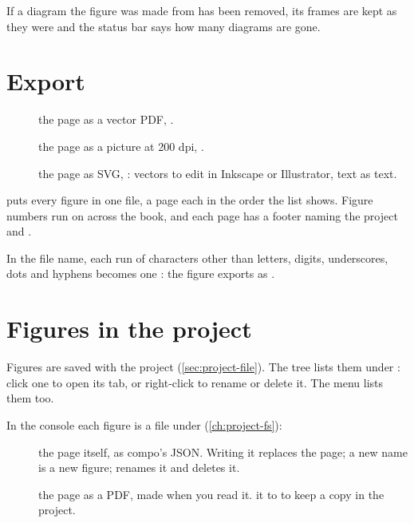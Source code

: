 If a diagram the figure was made from has been removed, its frames are kept as they were and the status
bar says how many diagrams are gone.

\section{Export}\label{sec:figure-export}

\begin{description}
\item[] the page as a vector PDF, .
\item[] the page as a picture at 200 dpi, .
\item[] the page as SVG, : vectors to edit in
Inkscape or Illustrator, text as text.
\end{description}

 puts every figure in one file, a page each in the order the
 list shows. Figure numbers run on across the book, and each page has a footer naming the project
and .

In the file name, each run of characters other than letters, digits, underscores, dots and hyphens
becomes one \code{\_}: the figure  exports as .

\section{Figures in the project}\label{sec:figures-project}

Figures are saved with the project (\cref{sec:project-file}). The tree lists them under : click
one to open its tab, or right-click to rename or delete it. The  menu lists them too.

In the console each figure is a file under  (\cref{ch:project-fs}):

\begin{description}
\item[] the page itself, as compo's JSON. Writing it replaces the page; a new name
is a new figure;  renames it and  deletes it.
\item[] the page as a PDF, made when you read it.  it to  to keep a
copy in the project.
\end{description}

